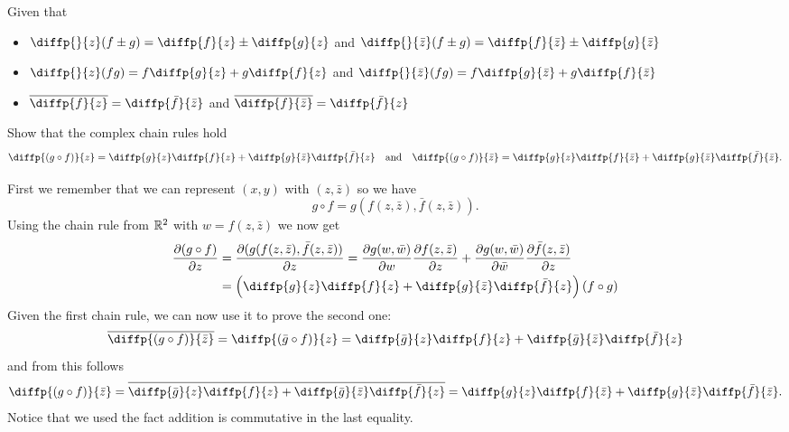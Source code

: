 \documentclass[11pt,a4paper]{article}
\begin{document}
\begin{exercise}
  Given that
  \begin{itemize}
    \item $\diffp{}{z}(f \pm g) = \diffp{f}{z} \pm \diffp{g}{z}$ and 
      $\diffp{}{{\bar z}}(f \pm g) = \diffp{f}{{\bar z}} \pm \diffp{g}{{\bar z}}$
    \item $\diffp{}{z}(f g) = f\diffp{g}{z} + g\diffp{f}{z}$ and 
      $\diffp{}{{\bar z}}(f g) = f\diffp{g}{{\bar z}} + g\diffp{f}{{\bar z}}$
    \item $\overline{\diffp{f}{z}} = \diffp{{\bar f}}{{\bar z}}$ and
      $\overline{\diffp{f}{{\bar z}}} = \diffp{{\bar f}}{z}$
  \end{itemize}
  Show that the complex chain rules hold
  \[
    \diffp{(g \circ f)}{z} =
    \diffp{g}{z} \diffp{f}{z} + \diffp{g}{{\bar z}} \diffp{\bar f}{z} \tand
    \diffp{(g \circ f)}{{\bar z}} =
    \diffp{g}{z} \diffp{f}{{\bar z}} + 
    \diffp{g}{{\bar z}} \diffp{\bar f}{{\bar z}}.
  \]
\end{exercise}
\begin{solution}
  First we remember that we can represent $(x,y)$ with $(z, \bar z)$ so
  we have
  \[
    g \circ f = g(f(z,\bar z),\bar f(z,\bar z)).
  \]
  Using the chain rule from $\mathbb{R}^2$ with $w = f(z, \bar z)$ we now get
  \begin{align*}
    \frac{\partial (g\circ f)}{\partial z} &=
    \frac{\partial (g(f(z,\bar z),\bar f(z,\bar z))}{\partial z} =
    \frac{\partial g(w,\bar w)}{\partial w}
    \frac{\partial f(z,\bar z)}{\partial z} +
    \frac{\partial g(w,\bar w)}{\partial \bar w}
    \frac{\partial \bar f(z,\bar z)}{\partial z} \\ &=
    \del{\diffp{g}{z} \diffp{f}{z} + \diffp{g}{{\bar z}} \diffp{\bar f}{z}}
    (f \circ g)
  \end{align*}
  Given the first chain rule, we can now use it to prove the second one:
  \[
    \overline{\diffp{(g \circ f)}{{\bar z}}} =
    \diffp{(\bar g \circ f)}{z} =
    \diffp{\bar g}{z} \diffp{f}{z} + 
    \diffp{{\bar g}}{{\bar z}} \diffp{\bar f}{z}
  \]
  and from this follows
  \[
    \diffp{(g \circ f)}{{\bar z}} =
    \overline{\diffp{\bar g}{z} \diffp{f}{z} + 
    \diffp{{\bar g}}{{\bar z}} \diffp{\bar f}{z}} =
    \diffp{g}{z} \diffp{f}{{\bar z}} + 
    \diffp{g}{{\bar z}} \diffp{\bar f}{{\bar z}}.
  \]
  Notice that we used the fact addition is commutative in the last equality.
\end{solution}
\end{document}
